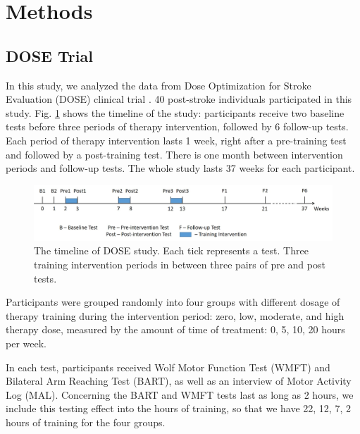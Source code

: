 \section{Methods}
\subsection{DOSE Trial}
In this study, we analyzed the data from Dose Optimization for Stroke Evaluation (DOSE) clinical trial \cite{}. 
40 post-stroke individuals participated in this study. 
Fig. \ref{fig:dosetimeline} shows the timeline of the study: participants receive two baseline tests before three periods of therapy intervention, followed by 6 follow-up tests. 
Each period of therapy intervention lasts 1 week, right after a pre-training test and followed by a post-training test. 
There is one month between intervention periods and follow-up tests. 
The whole study lasts 37 weeks for each participant.

\begin{figure}
	\centering
	\includegraphics[width=1\linewidth]{figures/dosetimeline}
	\caption[DOSE Study Timeline]{The timeline of DOSE study. Each tick represents a test. Three training intervention periods in between three pairs of pre and post tests.}
	\label{fig:dosetimeline}
\end{figure}


Participants were grouped randomly into four groups with different dosage of therapy training during the intervention period: zero, low, moderate, and high therapy dose, measured by the amount of time of treatment: 0, 5, 10, 20 hours per week.

In each test, participants received Wolf Motor Function Test (WMFT) and Bilateral Arm Reaching Test (BART), as well as an interview of Motor Activity Log (MAL). 
Concerning the BART and WMFT tests last as long as 2 hours, we include this testing effect into the hours of training, so that we have 22, 12, 7, 2 hours of training for the four groups.

